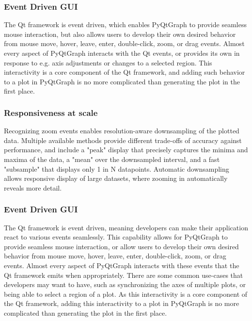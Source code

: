 \documentclass[journal]{vgtc}                %
\begin{document}
\color{DarkOrchid}
\subsubsection{Event Driven GUI}
The Qt framework is event driven, which enables PyQtGraph to provide seamless mouse interaction, but also allows users to develop their own desired behavior from mouse move, hover, leave, enter, double-click, zoom, or drag events. Almost every aspect of PyQtGraph interacts with the Qt events, or provides its own in response to e.g. axis adjustments or changes to a selected region. This interactivity is a core component of the Qt framework, and adding such behavior to a plot in PyQtGraph is no more complicated than generating the plot in the first place.

\subsubsection{Responsiveness at scale}

Recognizing zoom events enables resolution-aware downsampling of the plotted data. Multiple available methods provide different trade-offs of accuracy against performance, and include a "peak" display that precisely captures the minima and maxima of the data, a "mean" over the downsampled interval, and a fast "subsample" that displays only 1 in N datapoints. Automatic downsampling allows responsive display of large datasets, where zooming in automatically reveals more detail.



\color{brown}
\subsubsection{Event Driven GUI}

The Qt framework is event driven, meaning developers can make their application react to various events seamlessly.  This capability allows for PyQtGraph to provide seamless mouse interaction, or allow users to develop their own desired behavior from mouse move, hover, leave, enter, double-click, zoom, or drag events.  Almost every aspect of PyQtGraph interacts with these events that the Qt framework emits when appropriately.  There are some common use-cases that developers may want to have, such as synchronizing the axes of multiple plots, or being able to select a region of a plot.  As this interactivity is a core component of the Qt framework, adding this interactivity to a plot in PyQtGraph is no more complicated than generating the plot in the first place.
\end{document}
